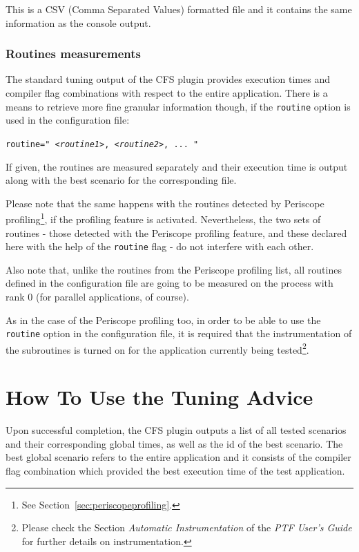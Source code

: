 \documentclass[11pt,a4paper, oneside]{book} %
\begin{document}
This is a CSV (Comma Separated Values) formatted file and it contains the same information as the console output.

\subsection{Routines measurements}\label{sec:routines}
The standard tuning output of the CFS plugin provides execution times and compiler flag combinations with respect to the entire application. There is a means to retrieve more fine granular information though, if the \texttt{routine} option is used in the configuration file:

\begin{center}
\begin{minipage}{0.8\textwidth}
\texttt{routine=" \textit{<routine1>}, \textit{<routine2>}, ... "}
\end{minipage}
\end{center}

If given, the routines are measured separately and their execution time is output along with the best scenario for the corresponding file.

Please note that the same happens with the routines detected by Periscope profiling\footnote{See Section~\ref{sec:periscopeprofiling}.}, if the profiling feature is activated. Nevertheless, the two sets of routines - those detected with the Periscope profiling feature, and these declared here with the help of the \texttt{routine} flag - do not interfere with each other.

Also note that, unlike the routines from the Periscope profiling list, all routines defined in the configuration file are going to be measured on the process with rank 0 (for parallel applications, of course).

As in the case of the Periscope profiling too, in order to be able to use the \texttt{routine} option in the configuration file, it is required that the instrumentation of the subroutines is turned on for the application currently being tested\footnote{Please check the Section \textit{Automatic Instrumentation} of the \textit{PTF User's Guide} for further details on instrumentation.}.

\chapter{How To Use the Tuning Advice}\label{sec:outputs}

Upon successful completion, the CFS plugin outputs a list of all tested scenarios and their corresponding global times, as well as the id of the best scenario. The best global scenario refers to the entire application and it consists of the compiler flag combination which provided the best execution time of the test application.
\end{document}
